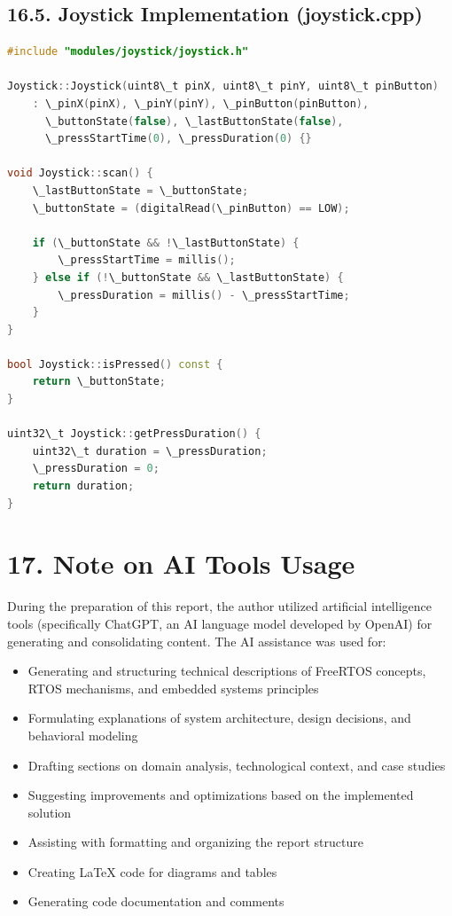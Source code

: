 \documentclass[12pt]{article}
\begin{document}
\subsection*{16.5. Joystick Implementation (joystick.cpp)}

\begin{lstlisting}[language=C++, caption=joystick.cpp - Joystick Driver Implementation]
#include "modules/joystick/joystick.h"

Joystick::Joystick(uint8\_t pinX, uint8\_t pinY, uint8\_t pinButton)
    : \_pinX(pinX), \_pinY(pinY), \_pinButton(pinButton),
      \_buttonState(false), \_lastButtonState(false),
      \_pressStartTime(0), \_pressDuration(0) {}

void Joystick::scan() {
    \_lastButtonState = \_buttonState;
    \_buttonState = (digitalRead(\_pinButton) == LOW);
    
    if (\_buttonState && !\_lastButtonState) {
        \_pressStartTime = millis();
    } else if (!\_buttonState && \_lastButtonState) {
        \_pressDuration = millis() - \_pressStartTime;
    }
}

bool Joystick::isPressed() const {
    return \_buttonState;
}

uint32\_t Joystick::getPressDuration() {
    uint32\_t duration = \_pressDuration;
    \_pressDuration = 0;
    return duration;
}
\end{lstlisting}

\section*{17. Note on AI Tools Usage}

During the preparation of this report, the author utilized artificial intelligence tools (specifically ChatGPT, an AI language model developed by OpenAI) for generating and consolidating content. The AI assistance was used for:

\begin{itemize}
    \item Generating and structuring technical descriptions of FreeRTOS concepts, RTOS mechanisms, and embedded systems principles
    \item Formulating explanations of system architecture, design decisions, and behavioral modeling
    \item Drafting sections on domain analysis, technological context, and case studies
    \item Suggesting improvements and optimizations based on the implemented solution
    \item Assisting with formatting and organizing the report structure
    \item Creating LaTeX code for diagrams and tables
    \item Generating code documentation and comments
\end{itemize}
\end{document}
